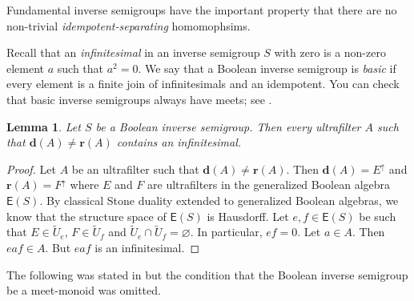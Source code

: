 \documentclass[a4paper]{amsart}
\newtheorem{lemma}[theorem]{Lemma}
\begin{document}
Fundamental inverse semigroups have the important property that
there are no non-trivial {\em idempotent-separating} homomophsims.


Recall that an {\em infinitesimal} in an inverse semigroup $S$ with zero
is a non-zero element $a$ such that $a^{2} = 0$.
We say that a Boolean inverse semigroup is {\em basic} if every element is 
a finite join of infinitesimals and an idempotent.
You can check that basic inverse semigroups always have meets; see \cite[Lemma 4.30]{Lawson3}.

\begin{lemma}\label{lem:infinitesimals-in-ultrafilters} Let $S$ be a Boolean inverse semigroup.
Then every ultrafilter $A$ such that $\mathbf{d}(A) \neq \mathbf{r}(A)$
contains an infinitesimal. 
\end{lemma}
\begin{proof} Let $A$ be an ultrafilter such that $\mathbf{d}(A) \neq \mathbf{r}(A)$.
Then $\mathbf{d}(A) = E^{\uparrow}$ and $\mathbf{r}(A) = F^{\uparrow}$ where $E$ and $F$ are ultrafilters in
the generalized Boolean algebra $\mathsf{E}(S)$.
By classical Stone duality extended to generalized Boolean algebras, 
we know that the structure space of $\mathsf{E}(S)$ is Hausdorff.
Let $e,f \in \mathsf{E}(S)$ be such that $E \in \widetilde{U}_{e}$, $F \in \widetilde{U}_{f}$ and $\widetilde{U}_{e} \cap \widetilde{U}_{f} = \varnothing$.
In particular, $ef = 0$.
Let $a \in A$.
Then $eaf \in A$.
But $eaf$ is an infinitesimal. 
\end{proof}

The following was stated in \cite[Proposition 4.31]{Lawson2017}
but the condition that the Boolean inverse semigroup be a meet-monoid was omitted.
\end{document}
